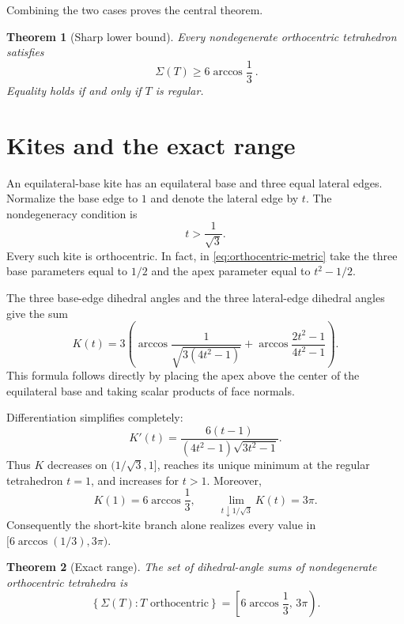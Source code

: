 \documentclass[11pt,a4paper]{article}
\newtheorem{theorem}{Theorem}[section]
\theoremstyle{definition}
\theoremstyle{remark}
\begin{document}
Combining the two cases proves the central theorem.

\begin{theorem}[Sharp lower bound]\label{thm:lower-bound}
Every nondegenerate orthocentric tetrahedron satisfies
\begin{equation}\label{eq:main-lower-bound}
 \boxed{\ \Sigma(T)\geq6\arccos\frac13\ }.
\end{equation}
Equality holds if and only if $T$ is regular.
\end{theorem}

\section{Kites and the exact range}\label{sec:kites}

An equilateral-base kite has an equilateral base and three equal lateral
edges.  Normalize the base edge to $1$ and denote the lateral edge by $t$.
The nondegeneracy condition is
\begin{equation}\label{eq:kite-domain}
 t>\frac1{\sqrt3}.
\end{equation}
Every such kite is orthocentric.  In fact, in
\eqref{eq:orthocentric-metric} take the three base parameters equal to
$1/2$ and the apex parameter equal to $t^2-1/2$.

The three base-edge dihedral angles and the three lateral-edge dihedral
angles give the sum
\begin{equation}\label{eq:kite-sum}
 K(t)=3\left(
 \arccos\frac{1}{\sqrt{3(4t^2-1)}}
 +\arccos\frac{2t^2-1}{4t^2-1}
 \right).
\end{equation}
This formula follows directly by placing the apex above the center of the
equilateral base and taking scalar products of face normals.

Differentiation simplifies completely:
\begin{equation}\label{eq:kite-derivative}
 K'(t)=
 \frac{6(t-1)}{(4t^2-1)\sqrt{3t^2-1}}.
\end{equation}
Thus $K$ decreases on $(1/\sqrt3,1]$, reaches its unique minimum at the
regular tetrahedron $t=1$, and increases for $t>1$.  Moreover,
\begin{equation}\label{eq:kite-limits}
 K(1)=6\arccos\frac13,
 \qquad
 \lim_{t\downarrow1/\sqrt3}K(t)=3\pi.
\end{equation}
Consequently the short-kite branch alone realizes every value in
$[6\arccos(1/3),3\pi)$.

\begin{theorem}[Exact range]\label{thm:range}
The set of dihedral-angle sums of nondegenerate orthocentric tetrahedra is
\begin{equation}\label{eq:exact-range}
 \boxed{
 \left\{\Sigma(T):T\text{ orthocentric}\right\}
 =\left[6\arccos\frac13,\,3\pi\right).
 }
\end{equation}
\end{theorem}
\end{document}
